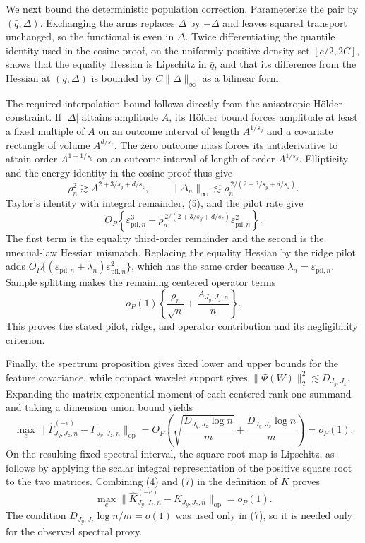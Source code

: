 We next bound the deterministic population correction.  Parameterize the pair by \((\bar q,\Delta)\).  Exchanging the arms replaces \(\Delta\) by \(-\Delta\) and leaves squared transport unchanged, so the functional is even in \(\Delta\).  Twice differentiating the quantile identity used in the cosine proof, on the uniformly positive density set \([c/2,2C]\), shows that the equality Hessian is Lipschitz in \(\bar q\), and that its difference from the Hessian at \((\bar q,\Delta)\) is bounded by \(C\|\Delta\|_\infty\) as a bilinear form.

The required interpolation bound follows directly from the anisotropic H\"older constraint.  If \(|\Delta|\) attains amplitude \(A\), its H\"older bound forces amplitude at least a fixed multiple of \(A\) on an outcome interval of length \(A^{1/s_y}\) and a covariate rectangle of volume \(A^{d/s_z}\).  The zero outcome mass forces its antiderivative to attain order \(A^{1+1/s_y}\) on an outcome interval of length of order \(A^{1/s_y}\).  Ellipticity and the energy identity in the cosine proof thus give
\[
\rho_n^2\gtrsim A^{2+3/s_y+d/s_z},
\qquad
\|\Delta_n\|_\infty
\lesssim\rho_n^{\,2/(2+3/s_y+d/s_z)}.                                     \tag{5}
\]
Taylor's identity with integral remainder, (5), and the pilot rate give
\[
O_P\!\left\{\varepsilon_{\mathrm{pil},n}^3
+\rho_n^{\,2/(2+3/s_y+d/s_z)}\varepsilon_{\mathrm{pil},n}^2\right\}.      \tag{6}
\]
The first term is the equality third-order remainder and the second is the unequal-law Hessian mismatch.  Replacing the equality Hessian by the ridge pilot adds
\(O_P\{(\varepsilon_{\mathrm{pil},n}+\lambda_n)\varepsilon_{\mathrm{pil},n}^2\}\), which has the same order because \(\lambda_n=\varepsilon_{\mathrm{pil},n}\).  Sample splitting makes the remaining centered operator terms
\[
o_P(1)\left\{\frac{\rho_n}{\sqrt n}+\frac{A_{J_y,J_z,n}}n\right\}.
\]
This proves the stated pilot, ridge, and operator contribution and its negligibility criterion.

Finally, the spectrum proposition gives fixed lower and upper bounds for the feature covariance, while compact wavelet support gives \(\|\Phi(W)\|_2^2\lesssim D_{J_y,J_z}\).  Expanding the matrix exponential moment of each centered rank-one summand and taking a dimension union bound yields
\[
\max_e\|\widehat\Gamma_{J_y,J_z,n}^{(-e)}-\Gamma_{J_y,J_z,n}\|_{\mathrm{op}}
=O_P\!\left(\sqrt{\frac{D_{J_y,J_z}\log n}{m}}
+\frac{D_{J_y,J_z}\log n}{m}\right)=o_P(1).                              \tag{7}
\]
On the resulting fixed spectral interval, the square-root map is Lipschitz, as follows by applying the scalar integral representation of the positive square root to the two matrices.  Combining (4) and (7) in the definition of \(K\) proves
\[
\max_e\|\widehat K_{J_y,J_z,n}^{(-e)}-K_{J_y,J_z,n}\|_{\mathrm{op}}=o_P(1).
\]
The condition \(D_{J_y,J_z}\log n/m=o(1)\) was used only in (7), so it is needed only for the observed spectral proxy.